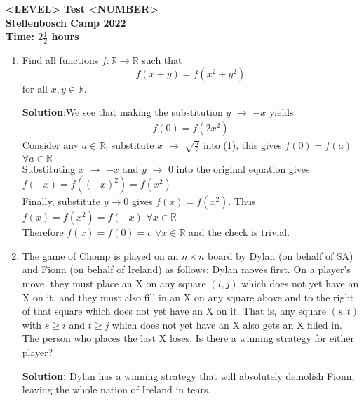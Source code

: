 \documentclass{article}
\begin{document}
\thispagestyle{empty}

\begin{center}
  \textbf{\Large <LEVEL> Test <NUMBER>}
  \\ \vspace{1em}
  \textbf{\large Stellenbosch Camp 2022}
  \\ \vspace{1em}
  \textbf{\large Time: $2\frac{1}{2}$ hours}
\end{center}

\bigskip

\begin{enumerate}[itemsep=\fill]

\item
Find all functions $f : \mathbb{R} \to \mathbb{R}$ such that \[ f(x+y) = f(x^2+y^2) \] for all $x,y \in \mathbb{R}$.

\textbf{Solution}:We see that making the substitution $y$ $\rightarrow$ $-x$ yields 
\begin{align}
    f(0)=f(2x^{2})
\end{align}
Consider any $a \in \mathbb{R}$, substitute $x$ $\rightarrow$ $\sqrt{\frac{a}{2}}$ into (1), this gives $f(0) = f(a)$ $\forall a \in \mathbb{R^{+}}$
\\Substituting $x$ $\rightarrow$ $-x$ and $y$ $\rightarrow$ $0$ into the original equation gives $f(-x) = f((-x)^{2}) = f(x^{2})$
\\Finally, substitute $y \rightarrow 0$ gives $f(x) = f(x^{2})$. Thus $f(x)= f(x^{2}) = f(-x)$ $\forall x \in \mathbb{R}$
\\Therefore $f(x) = f(0) = c$ $\forall x \in \mathbb{R}$ and the check is trivial.

\item %
The game of Chomp is played on an $n \times n$ board by Dylan (on behalf of SA) and Fionn (on behalf of Ireland) as follows: Dylan moves first.
On a player's move, they must place an X on any square $(i, j)$ which does not yet have an X on it, and they must also fill in an X on any square above and to the right of that square which does not yet have an X on it.
That is, any square $(s, t)$ with $s \geq i$ and $t \geq j$ which does not yet have an X also gets an X filled in.
The person who places the last X loses.
Is there a winning strategy for either player?

\textbf{Solution:}
Dylan has a winning strategy that will absolutely demolish Fionn, leaving the whole nation of Ireland in tears. 


\end{enumerate}
\end{document}
